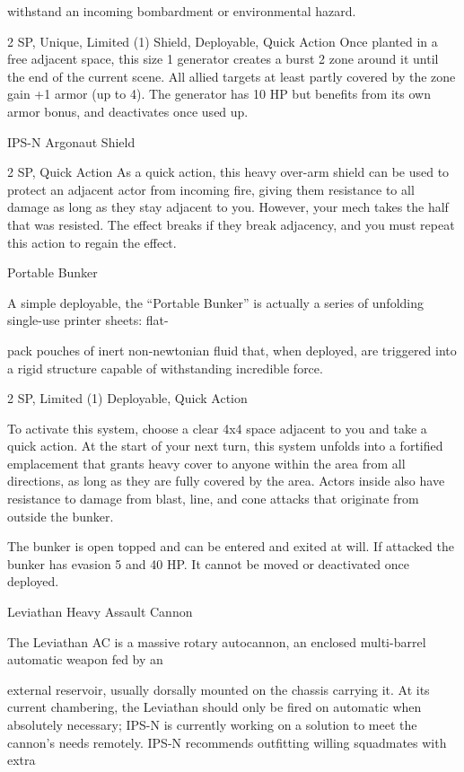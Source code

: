 withstand an incoming bombardment or environmental hazard.     

2 SP, Unique, Limited (1)  
Shield, Deployable, Quick Action  
Once planted in a free adjacent space, this size 1 generator creates a burst 2 zone around it until  
the end of the current scene. All allied targets at least partly covered by the zone gain +1 armor  
(up to 4). The generator has 10 HP but benefits from its own armor bonus, and deactivates once  
used up.
 

IPS-N Argonaut Shield  

2 SP, Quick Action  
As a quick action, this heavy over-arm shield can be used to protect an adjacent actor from  
incoming fire, giving them resistance to all damage as long as they stay adjacent to you.  
However, your mech takes the half that was resisted. The effect breaks if they break adjacency,  
and you must repeat this action to regain the effect.
 

Portable Bunker
 

A simple deployable, the “Portable Bunker” is actually a series of unfolding single-use printer sheets: flat- 

pack pouches of inert non-newtonian fluid that, when deployed, are triggered into a rigid structure capable  
of withstanding incredible force.   

2 SP, Limited (1)  
Deployable, Quick Action
 
To activate this system, choose a clear 4x4 space adjacent to you and take a quick action. At the  
start of your next turn, this system unfolds into a fortified emplacement that grants heavy cover  
to anyone within the area from all directions, as long as they are fully covered by the area. Actors  
inside also have resistance to damage from blast, line, and cone attacks that originate from  
outside the bunker.
 

The bunker is open topped and can be entered and exited at will. If attacked the bunker has  
evasion 5 and 40 HP. It cannot be moved or deactivated once deployed.
 

                                                                                                                  


Leviathan Heavy Assault Cannon  

The Leviathan AC is a massive rotary autocannon, an enclosed multi-barrel automatic weapon fed by an  

external reservoir, usually dorsally mounted on the chassis carrying it. At its current chambering, the  
Leviathan should only be fired on automatic when absolutely necessary; IPS-N is currently working on a  
solution to meet the cannon’s needs remotely. IPS-N recommends outfitting willing squadmates with extra  

